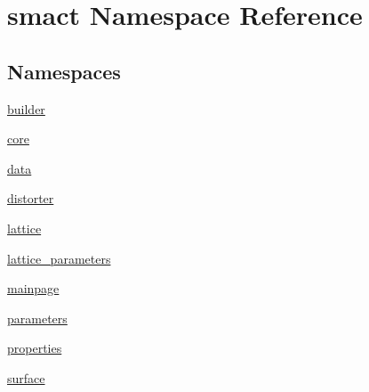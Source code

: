 \hypertarget{namespacesmact}{}\section{smact Namespace Reference}
\label{namespacesmact}
\subsection*{Namespaces}
\begin{DoxyCompactItemize}
\item 
 \hyperlink{namespacesmact_1_1builder}{builder}
\item 
 \hyperlink{namespacesmact_1_1core}{core}
\item 
 \hyperlink{namespacesmact_1_1data}{data}
\item 
 \hyperlink{namespacesmact_1_1distorter}{distorter}
\item 
 \hyperlink{namespacesmact_1_1lattice}{lattice}
\item 
 \hyperlink{namespacesmact_1_1lattice__parameters}{lattice\+\_\+parameters}
\item 
 \hyperlink{namespacesmact_1_1mainpage}{mainpage}
\item 
 \hyperlink{namespacesmact_1_1parameters}{parameters}
\item 
 \hyperlink{namespacesmact_1_1properties}{properties}
\item 
 \hyperlink{namespacesmact_1_1surface}{surface}
\end{DoxyCompactItemize}
